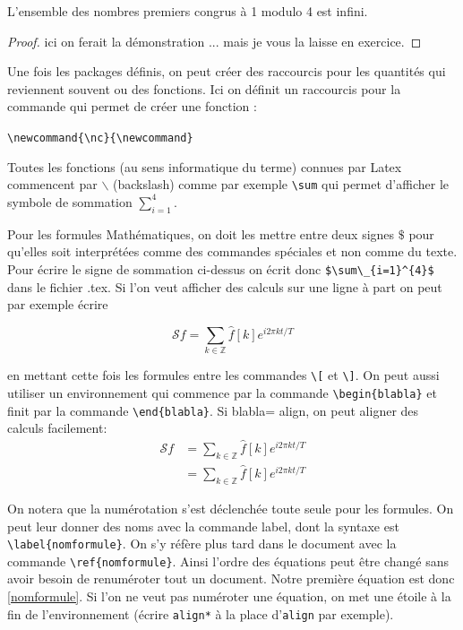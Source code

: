 \documentclass[a4paper,10pt]{article}
\begin{document}
\begin{theorem}
 L'ensemble des nombres premiers congrus à 1 modulo 4 est infini.
\end{theorem}

\begin{proof}
 ici on ferait la démonstration ... mais  je vous la laisse en exercice.
\end{proof}



Une fois les packages définis, on peut créer des raccourcis pour les quantités qui reviennent souvent ou des fonctions. Ici on définit un raccourcis pour la commande qui permet de créer une fonction :\medskip

\lstinline+\newcommand{\nc}{\newcommand}+

\begin{rem}
 Toutes les fonctions (au sens informatique du terme) connues par Latex commencent par $\backslash$ (backslash) comme par exemple \lstinline+\sum+
 qui permet d'afficher le symbole de sommation $\sum_{i=1}^{4}$. 
\end{rem}


Pour les formules Mathématiques, on doit  les mettre entre deux signes 
$\$$ pour qu'elles soit interprétées comme des commandes spéciales et non comme du texte. 
Pour écrire le signe de sommation ci-dessus on écrit donc \lstinline+$\sum\_{i=1}^{4}$+ dans le fichier .tex. Si l'on veut afficher des calculs sur une ligne à part on peut par exemple écrire 

\[\mathcal{S}f = \sum_{k\in\mathbb{Z}} \hat f[k] e^{i2\pi kt/T} \] 

en mettant cette fois les formules  entre  les commandes 
\lstinline+\[+ et \lstinline+\]+. On peut aussi utiliser un environnement qui commence par la commande 
\lstinline+\begin{blabla}+ et finit par la commande \lstinline+\end{blabla}+. Si blabla= align, 
on peut aligner des calculs facilement:
\begin{align}
 \mathcal{S}f & = \sum_{k\in\mathbb{Z}} \hat f[k] e^{i2\pi kt/T} \label{nomformule}\\
  & = \sum_{k\in\mathbb{Z}} \hat f[k] e^{i2\pi kt/T}
\end{align}

\begin{rem}
On notera que la numérotation s'est déclenchée toute seule pour les formules. 
On peut  leur donner des noms avec la commande label,  dont la syntaxe est  \lstinline+\label{nomformule}+.  
On s'y réfère plus tard dans le document  avec la commande \lstinline+\ref{nomformule}+. 
Ainsi l'ordre des équations peut être changé sans avoir besoin de renuméroter tout un document. 
Notre première équation est donc \ref{nomformule}. 
Si l'on ne veut pas numéroter une équation,  on met une étoile à la fin de l'environnement 
(écrire \lstinline+align*+ à la place d'\lstinline+align+ par exemple).
\end{rem}
\end{document}
